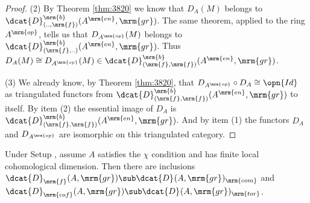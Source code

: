 \begin{proof}
\medskip \noindent
(2)  By Theorem \ref{thm:3820} we know that 
$D_A(M)$ belongs to 
$\dcat{D}^{\mrm{b}}_{(.., \mrm{f})}(A^{\mrm{en}}, \mrm{gr})$.
The same theorem, applied to the ring $A^{\mrm{op}}$, tells us that 
$D_{A^{\mrm{op}}}(M)$ belongs to 
$\dcat{D}^{\mrm{b}}_{(\mrm{f}, ..)}(A^{\mrm{en}}, \mrm{gr})$.
Thus 
$D_A(M) \cong D_{A^{\mrm{op}}}(M) \in 
\dcat{D}^{\mrm{b}}_{(\mrm{f}, \mrm{f})}(A^{\mrm{en}}, \mrm{gr})$.

\medskip \noindent
(3) We already know, by Theorem \ref{thm:3820}, that 
$D_{A^{\mrm{op}}} \circ D_A \cong \opn{Id}$
as triangulated functors from 
$\dcat{D}^{\mrm{b}}_{(\mrm{f}, \mrm{f})}(A^{\mrm{en}}, \mrm{gr})$
to itself. By item (2) the essential image of 
$D_A$ is 
$\dcat{D}^{\mrm{b}}_{(\mrm{f}, \mrm{f})}(A^{\mrm{en}}, \mrm{gr})$. 
And by item (1) the functors $D_A$ and $D_{A^{\mrm{op}}}$ are isomorphic 
on this triangulated category. 
\end{proof}

\begin{lem} \label{lem:4060}
Under Setup \tup{\ref{setup:3925}}, assume $A$ satisfies the $\chi$ condition 
and has finite local cohomological dimension. 
Then there are inclusions 
$\dcat{D}^{}_{\mrm{f}}(A, \mrm{gr}) \sub
\dcat{D}^{}(A, \mrm{gr})_{\mrm{com}}$
and
$\dcat{D}^{}_{\mrm{cof}}(A, \mrm{gr}) \sub
\dcat{D}^{}(A, \mrm{gr})_{\mrm{tor}}$.
\end{lem}

